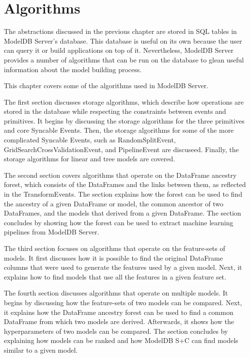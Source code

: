 \chapter{Algorithms}
The abstractions discussed in the previous chapter are stored in SQL tables in
ModelDB Server's database. This database is useful on its own because the user can
query it or build applications on top of it. Nevertheless, ModelDB Server provides
a number of algorithms that can be run on the database to glean useful information
about the model building process.

This chapter covers some of the algorithms used in ModelDB Server. 

The first section discusses storage algorithms, which describe how operations are stored in the database while
respecting the constraints between events and primitives. It begins by discussing the
storage algorithms for the three primitives and core
Syncable Events. Then, the storage algorithms for some
of the more complicated Syncable Events, such as RandomSplitEvent, GridSearchCrossValidationEvent,
and PipelineEvent are discuseed. Finally, the storage algorithms for linear and tree models are
covered.

The second section covers algorithms that operate on the DataFrame ancestry forest, which consists
of the DataFrames and the links between them, as reflected in the TransformEvents. The section explains
how the forest can be used to find the ancestry of a given DataFrame or model, the common ancestor of two
DataFrames, and the models that derived from a given DataFrame. The section concludes by showing how the
forest can be used to extract machine learning pipelines from ModelDB Server.

The third section focuses on algorithms that operate on the feature-sets of models. It first discusses how
it is possible to find the original DataFrame columns that were used to generate the features used by a given model.
Next, it explains how to find models that use all the features in a given feature set. 

The fourth section discusses algorithms that operate on multiple models. It begins by
discussing how the feature-sets of two models can be compared. Next, it explains
how the DataFrame ancestry forest can be used to find a common DataFrame from
which two models are derived. Afterwards, it shows how the hyperparameters of two
models can be compared. The section concludes by explaining how models can be ranked
and how ModelDB S+C can find models similar to a given model.

